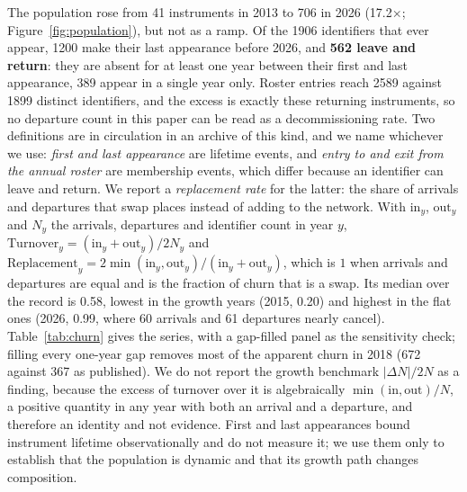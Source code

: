 \documentclass{article}
\newcommand{\nFirst}{41}
\newcommand{\nLast}{706}
\newcommand{\growth}{17.2}
\newcommand{\replMedian}{0.58}
\begin{document}
The population rose from \nFirst{} instruments in 2013 to \nLast{} in 2026
(\growth$\times$; Figure~\ref{fig:population}), but not as a ramp. Of the \num{1906}
identifiers that ever appear, \num{1200} make their last appearance before 2026, and
\textbf{562 leave and return}: they are absent for at least one year between their first and
last appearance, 389 appear in a single year only. Roster entries reach \num{2589} against
\num{1899} distinct identifiers, and the excess is exactly these returning instruments, so no
departure count in this paper can be read as a decommissioning rate. Two definitions are in
circulation in an archive of this kind, and we name whichever we use: \emph{first and last
appearance} are lifetime events, and \emph{entry to and exit from the annual roster} are
membership events, which differ because an identifier can leave and return. We report a
\emph{replacement rate} for the latter: the share of arrivals and departures that swap places
instead of adding to the network. With $\mathrm{in}_y$, $\mathrm{out}_y$ and $N_y$ the arrivals,
departures and identifier count in year $y$, $\mathrm{Turnover}_y =
(\mathrm{in}_y+\mathrm{out}_y)/2N_y$ and $\mathrm{Replacement}_y =
2\min(\mathrm{in}_y,\mathrm{out}_y)/(\mathrm{in}_y+\mathrm{out}_y)$, which is $1$ when arrivals
and departures are equal and is the fraction of churn that is a swap. Its median over the record
is \replMedian{}, lowest in the growth years (2015, 0.20) and highest in the flat ones (2026,
0.99, where 60 arrivals and 61 departures nearly cancel). Table~\ref{tab:churn} gives the series,
with a gap-filled panel as the sensitivity check; filling every one-year gap removes most of the
apparent churn in 2018 (672 against 367 as published). We do not report the growth benchmark
$|\Delta N|/2N$ as a finding, because the excess of turnover over it is algebraically
$\min(\mathrm{in},\mathrm{out})/N$, a positive quantity in any year with both an arrival and a
departure, and therefore an identity and not evidence. First and last appearances bound instrument
lifetime observationally and do not measure it; we use them only to establish that the
population is dynamic and that its growth path changes composition.
\end{document}
